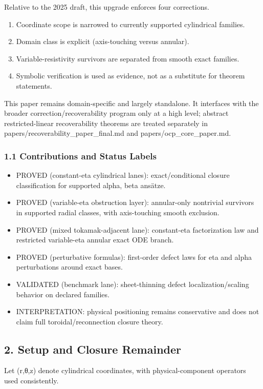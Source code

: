 \documentclass[11pt]{article}
\begin{document}
Relative to the 2025 draft, this upgrade enforces four corrections.


\begin{enumerate}
\item Coordinate scope is narrowed to currently supported cylindrical families.
\item Domain class is explicit (axis-touching versus annular).
\item Variable-resistivity survivors are separated from smooth exact families.
\item Symbolic verification is used as evidence, not as a substitute for theorem statements.
\end{enumerate}

This paper remains domain-specific and largely standalone. It interfaces with the broader correction/recoverability program only at a high level; abstract restricted-linear recoverability theorems are treated separately in papers/recoverability\_paper\_final.md and papers/ocp\_core\_paper.md.


\subsubsection*{1.1 Contributions and Status Labels}
\begin{itemize}
\item PROVED (constant-eta cylindrical lanes): exact/conditional closure classification for supported alpha, beta ansätze.
\item PROVED (variable-eta obstruction layer): annular-only nontrivial survivors in supported radial classes, with axis-touching smooth exclusion.
\item PROVED (mixed tokamak-adjacent lane): constant-eta factorization law and restricted variable-eta annular exact ODE branch.
\item PROVED (perturbative formulas): first-order defect laws for eta and alpha perturbations around exact bases.
\item VALIDATED (benchmark lane): sheet-thinning defect localization/scaling behavior on declared families.
\item INTERPRETATION: physical positioning remains conservative and does not claim full toroidal/reconnection closure theory.
\end{itemize}

\subsection*{2. Setup and Closure Remainder}
Let (r,θ,z) denote cylindrical coordinates, with physical-component operators used consistently.
\end{document}
